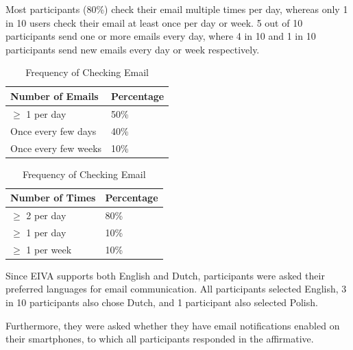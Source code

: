 \documentclass{article}
\begin{document}
Most participants (80\%) check their email multiple times per day, whereas only 1 in 10 users check their email at least once per day or week. 5 out of 10 participants send one or more emails every day, where 4 in 10 and 1 in 10 participants send new emails every day or week respectively.

\begin{table}[!htb]
    \begin{minipage}{.5\linewidth}
   	 \caption{Frequency of Emails Sent}
      \centering
        \begin{tabular}{ll}
	        \hline
            \textbf{Number of Emails} & \textbf{Percentage} \\
            \hline
            $\geq$ 1 per day & 50\% \\
            Once every few days & 40\% \\
            Once every few weeks & 10\% \\
            \hline
        \end{tabular}
    \end{minipage}%
    \hspace{.1cm}
    \begin{minipage}{.5\linewidth}
      \centering
	    \caption{Frequency of Checking Email}
        \begin{tabular}{ll}
	        \hline
            \textbf{Number of Times} & \textbf{Percentage} \\
            \hline
            $\geq$ 2 per day & 80\% \\
            $\geq$ 1 per day & 10\% \\
            $\geq$ 1 per week & 10\% \\
            \hline
        \end{tabular}
    \end{minipage} 
\end{table}

Since EIVA supports both English and Dutch, participants were asked their preferred languages for email communication. All participants selected English, 3 in 10 participants also chose Dutch, and 1 participant also selected Polish.

Furthermore, they were asked whether they have email notifications enabled on their smartphones, to which all participants responded in the affirmative.
\end{document}
